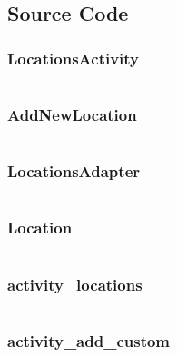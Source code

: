 \documentclass[11pt,english,numbers=endperiod,parskip=half]{scrartcl}
\begin{document}
\begin{landscape}
\subsection{Source Code}
\subsubsection{LocationsActivity}
\inputminted{java}{../../Apps/Suntime-Custom/app/src/main/java/au/net/danielparker/suntime/ui/LocationsActivity.java}

\subsubsection{AddNewLocation}
\inputminted{java}{../../Apps/Suntime-Custom/app/src/main/java/au/net/danielparker/suntime/ui/AddNewLocation.java}

\subsubsection{LocationsAdapter}
\inputminted{java}{../../Apps/Suntime-Custom/app/src/main/java/au/net/danielparker/suntime/ui/LocationsAdapter.java}

\subsubsection{Location}
\inputminted{java}{../../Apps/Suntime-Custom/app/src/main/java/au/net/danielparker/suntime/model/Location.java}

\subsubsection{activity\_locations}
\inputminted{xml}{../../Apps/Suntime-Custom/app/src/main/res/layout/activity_locations.xml}

\subsubsection{activity\_add\_custom}
\inputminted{xml}{../../Apps/Suntime-Custom/app/src/main/res/layout/activity_add_custom.xml}

\end{landscape}
\end{document}
